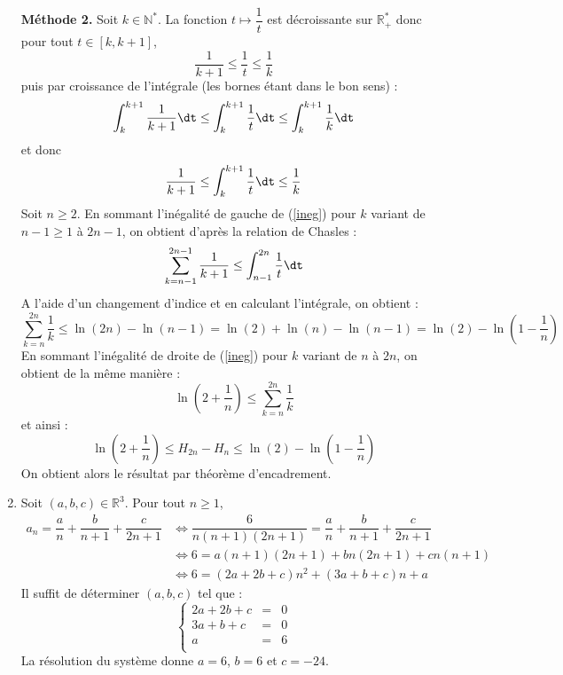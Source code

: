 \documentclass[a4paper,10pt]{report}
\begin{document}
\begin{enumerate}
\noindent \textbf{Méthode 2.} Soit $k \in \mathbb{N}^*$. La fonction $t \mapsto \dfrac{1}{t}$ est décroissante sur $\mathbb{R}_+^{*}$ donc pour tout $t \in [k,k+1]$,
$$ \dfrac{1}{k+1} \leq \dfrac{1}{t} \leq \dfrac{1}{k}$$
puis par croissance de l'intégrale (les bornes étant dans le bon sens) :
$$ \int_{k}^{k+1} \dfrac{1}{k+1} \dt \leq \int_{k}^{k+1} \dfrac{1}{t} \dt \leq \int_{k}^{k+1} \dfrac{1}{k} \dt$$
et donc 
\begin{equation}\label{ineg}
 \dfrac{1}{k+1}  \leq \int_{k}^{k+1} \dfrac{1}{t} \dt \leq  \dfrac{1}{k} 
\end{equation}
Soit $n \geq 2$. En sommant l'inégalité de gauche de (\ref{ineg}) pour $k$ variant de $n-1 \geq 1$ à $2n-1$, on obtient d'après la relation de Chasles :
$$ \sum_{k=n-1}^{2n-1} \dfrac{1}{k+1} \leq \int_{n-1}^{2n}  \dfrac{1}{t} \dt$$
A l'aide d'un changement d'indice et en calculant l'intégrale, on obtient :
$$ \sum_{k=n}^{2n} \dfrac{1}{k} \leq \ln(2n)-\ln(n-1) = \ln(2)+ \ln(n)-\ln(n-1) = \ln(2)- \ln \left(1- \dfrac{1}{n}\right)$$
En sommant l'inégalité de droite de (\ref{ineg}) pour $k$ variant de $n$ à $2n$, on obtient de la même manière :
$$ \ln \left( 2 + \dfrac{1}{n}\right)  \leq  \sum_{k=n}^{2n} \dfrac{1}{k} $$
et ainsi :
$$ \ln \left( 2 + \dfrac{1}{n}\right)  \leq  H_{2n}-H_n \leq \ln(2)- \ln \left(1- \dfrac{1}{n}\right)$$
On obtient alors le résultat par théorème d'encadrement.
\item Soit $(a,b,c) \in \mathbb{R}^3$. Pour tout $n \geq 1$,
\begin{align*}
a_n = \dfrac{a}{n} + \dfrac{b}{n+1} + \dfrac{c}{2n+1} & \Longleftrightarrow  \dfrac{6}{n(n+1)(2n+1)} = \dfrac{a}{n} + \dfrac{b}{n+1} + \dfrac{c}{2n+1} \\
& \Longleftrightarrow 6= a(n+1)(2n+1)+bn(2n+1)+cn(n+1) \\
& \Longleftrightarrow 6= (2a+2b+c)n^2 + (3a+b+c)n + a 
\end{align*}
Il suffit de déterminer $(a,b,c)$ tel que :
$$ \left\lbrace \begin{array}{rcl}
2a+2b+c & = & 0 \\
3a+b+c & =& 0 \\
a& = &6 \\
\end{array}\right.$$
La résolution du système donne $a=6$, $b=6$ et $c=-24$.


\end{enumerate}
\end{document}
